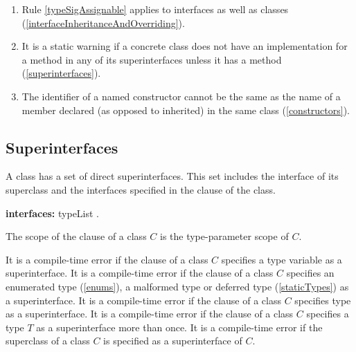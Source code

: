 \documentclass{article}
\begin{document}
{\begin{enumerate}
\begin{itemize}
  \end{itemize}  (\ref{interfaceInheritanceAndOverriding})
\item  Rule \ref{typeSigAssignable} applies to interfaces as well as classes  (\ref{interfaceInheritanceAndOverriding}).
\item  It is a static warning if a concrete class does not have an implementation for a  method in any of its superinterfaces  unless it has a  method (\ref{superinterfaces}).
\item The identifier of a named constructor cannot be the same as the name of a member declared (as opposed to inherited) in the same class (\ref{constructors}).
\end{enumerate}
}



\subsection{ Superinterfaces}

\LMHash{}
A class has a set of direct superinterfaces. This set includes the interface of its superclass and the interfaces specified in the \IMPLEMENTS{}  clause of the class.

\begin{grammar}
{\bf interfaces:}
      \IMPLEMENTS{} typeList
    .
\end{grammar}

\LMHash{}
The scope of the \IMPLEMENTS{} clause of a class $C$ is the type-parameter scope of $C$.

\LMHash{}
It is a compile-time error if  the \IMPLEMENTS{}  clause of a class $C$ specifies a type variable as a superinterface. It is a compile-time error if  the  \IMPLEMENTS{} clause of a class $C$ specifies an enumerated type (\ref{enums}),  a malformed type or deferred type (\ref{staticTypes}) as a superinterface.  It is a compile-time error if the \IMPLEMENTS{} clause of a class $C$ specifies type \DYNAMIC{} as a superinterface. It is a compile-time error if  the  \IMPLEMENTS{} clause of a class $C$ specifies  a type $T$ as a superinterface more than once.
It is a compile-time error if the superclass of a class $C$ is specified as a superinterface of $C$.
\end{document}
